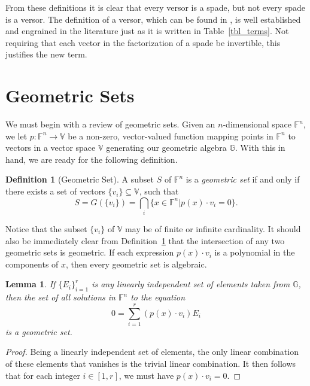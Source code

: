 \documentclass{birkjour}
\newtheorem{lem}[thm]{Lemma}
\theoremstyle{definition}
\newtheorem{defn}[thm]{Definition}
\theoremstyle{remark}
\numberwithin{equation}{section}
\newcommand{\F}{\mathbb{F}}
\newcommand{\G}{\mathbb{G}}
\newcommand{\V}{\mathbb{V}}
\begin{document}
From these definitions it is clear that every versor is a spade, but not every spade is a versor.  The definition of a versor,
which can be found in \cite[p. 90]{Perwass09}, is well established and engrained in the literature just as it is written in Table~\ref{tbl_terms}.  Not requiring
that each vector in the factorization of a spade be invertible, this justifies the new term.

\section{Geometric Sets}

We must begin with a review of geometric sets.  Given an $n$-dimensional space $\F^n$, we let $p:\F^n\to\V$ be a non-zero, vector-valued
function mapping points in $\F^n$ to vectors in a vector space $\V$ generating our geometric algebra $\G$.  With this in hand,
we are ready for the following definition.
\begin{defn}[Geometric Set]\label{def_geo_set}
A subset $S$ of $\F^n$ is a \emph{geometric set} if and only if there exists a set of vectors $\{v_i\}\subseteq\V$, such that
\begin{equation}\label{equ_geo_set_def}
S = G(\{v_i\}) = \bigcap_i \{x\in\F^n|p(x)\cdot v_i=0\}.
\end{equation}
\end{defn}
Notice that the subset $\{v_i\}$ of $\V$ may be of finite or infinite cardinality.  It should also be immediately clear
from Definition~\ref{def_geo_set} that the intersection of any two geometric sets is geometric.
If each expression $p(x)\cdot v_i$ is a polynomial in the components of $x$, then every geometric set is algebraic.

\begin{lem}\label{lem_geo_set_lin_indep}
If $\{E_i\}_{i=1}^r$ is any linearly independent set of elements taken from $\G$, then the set of all
solutions in $\F^n$ to the equation
\begin{equation}\label{equ_geo_set}
0 = \sum_{i=1}^r (p(x)\cdot v_i)E_i
\end{equation}
is a geometric set.
\end{lem}
\begin{proof}
Being a linearly independent set of elements, the only linear combination of these elements that vanishes is the trivial linear combination.
It then follows that for each integer $i\in[1,r]$, we must have $p(x)\cdot v_i=0$.
\end{proof}
\end{document}
